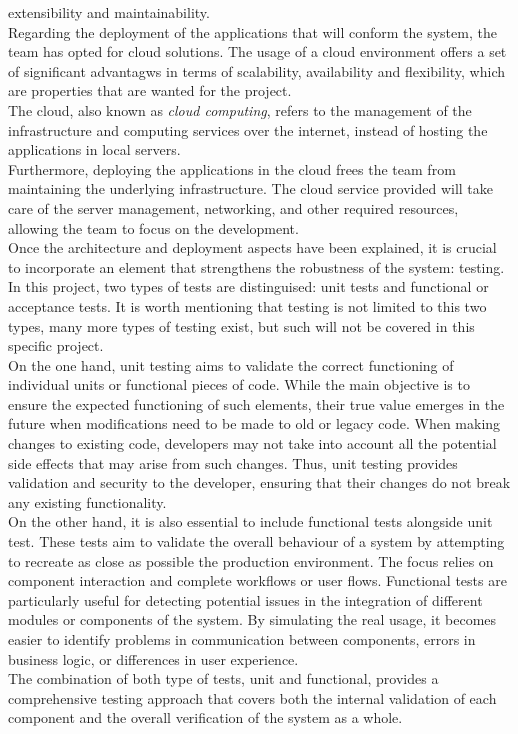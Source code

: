 \documentclass[../memory.tex]{subfiles}
\begin{document}
extensibility and maintainability.
\\[8pt]
Regarding the deployment of the applications that will conform the system, the
team has opted for cloud solutions. The usage of a cloud environment offers a
set of significant advantagws in terms of scalability, availability and
flexibility, which are properties that are wanted for the project.
\\
The cloud, also known as \emph{cloud computing}, refers to the management of the
infrastructure and computing services over the internet, instead of hosting the
applications in local servers.
\\
Furthermore, deploying the applications in the cloud frees the team from
maintaining the underlying infrastructure. The cloud service provided will take
care of the server management, networking, and other required resources,
allowing the team to focus on the development.
\\[8pt]
Once the architecture and deployment aspects have been explained, it is crucial
to incorporate an element that strengthens the robustness of the system:
testing. In this project, two types of tests are distinguised: unit tests and
functional or acceptance tests. It is worth mentioning that testing is not
limited to this two types, many more types of testing exist, but such will not
be covered in this specific project.
\\
On the one hand, unit testing aims to validate the correct functioning of
individual units or functional pieces of code. While the main objective is to
ensure the expected functioning of such elements, their true value emerges in
the future when modifications need to be made to old or legacy code. When making
changes to existing code, developers may not take into account all the potential
side effects that may arise from such changes. Thus, unit testing provides
validation and security to the developer, ensuring that their changes do not
break any existing functionality.
\\
On the other hand, it is also essential to include functional tests alongside
unit test. These tests aim to validate the overall behaviour of a system by
attempting to recreate as close as possible the production environment. The
focus relies on component interaction and complete workflows or user flows.
Functional tests are particularly useful for detecting potential issues in the
integration of different modules or components of the system. By simulating the
real usage, it becomes easier to identify problems in communication between
components, errors in business logic, or differences in user experience.
\\
The combination of both type of tests, unit and functional, provides a
comprehensive testing approach that covers both the internal validation of each
component and the overall verification of the system as a whole.
\end{document}
